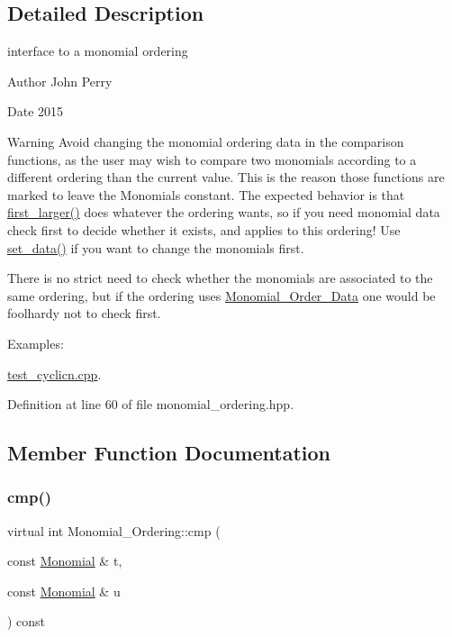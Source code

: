 \subsection{Detailed Description}
interface to a monomial ordering 

\begin{DoxyAuthor}{Author}
John Perry 
\end{DoxyAuthor}
\begin{DoxyDate}{Date}
2015 
\end{DoxyDate}
\begin{DoxyWarning}{Warning}
Avoid changing the monomial ordering data in the comparison functions, as the user may wish to compare two monomials according to a different ordering than the current value. This is the reason those functions are marked to leave the Monomials constant. The expected behavior is that \hyperlink{class_monomial___ordering_aed41fe82e1ca5cd287a93d287fee7c20}{first\+\_\+larger()} does whatever the ordering wants, so if you need monomial data check first to decide whether it exists, and applies to this ordering! Use \hyperlink{class_monomial___ordering_ae7e09d51f301b747b836ba54a79a85d3}{set\+\_\+data()} if you want to change the monomials first.

There is no strict need to check whether the monomials are associated to the same ordering, but if the ordering uses \hyperlink{class_monomial___order___data}{Monomial\+\_\+\+Order\+\_\+\+Data} one would be foolhardy not to check first. 
\end{DoxyWarning}
\begin{Desc}
\item[Examples\+: ]\par
\hyperlink{test_cyclicn_8cpp-example}{test\+\_\+cyclicn.\+cpp}.\end{Desc}


Definition at line 60 of file monomial\+\_\+ordering.\+hpp.



\subsection{Member Function Documentation}
\mbox{\label{class_monomial___ordering_a9bc3155fc98b4d40c26118fa2114b827}} 
\subsubsection{\texorpdfstring{cmp()}{cmp()}}
{\footnotesize\ttfamily virtual int Monomial\+\_\+\+Ordering\+::cmp (\begin{DoxyParamCaption}\item[{const \hyperlink{class_monomial}{Monomial} \&}]{t,  }\item[{const \hyperlink{class_monomial}{Monomial} \&}]{u }\end{DoxyParamCaption}) const\hspace{0.3cm}{\ttfamily [pure virtual]}}



